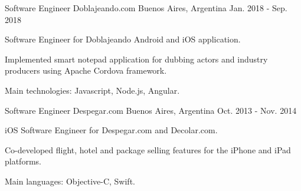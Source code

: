 

\begin{cventries}

    \cventry
      {Software Engineer}
      {Doblajeando.com}
      {Buenos Aires, Argentina}
      {Jan. 2018 - Sep. 2018}
      {
        \begin{cvitems}
          \item Software Engineer for Doblajeando Android and iOS application.
          \item Implemented smart notepad application for dubbing actors and industry producers using Apache Cordova framework.
          \item Main technologies: Javascript, Node.js, Angular.
        \end{cvitems}
      } 

    \cventry
      {Software Engineer}
      {Despegar.com}
      {Buenos Aires, Argentina}
      {Oct. 2013 - Nov. 2014}
      {
        \begin{cvitems}
          \item iOS Software Engineer for Despegar.com and Decolar.com. 
          \item Co-developed flight, hotel and package selling features for the iPhone and iPad platforms. 
          \item Main languages: Objective-C, Swift.
        \end{cvitems}
      } 
\end{cventries}
